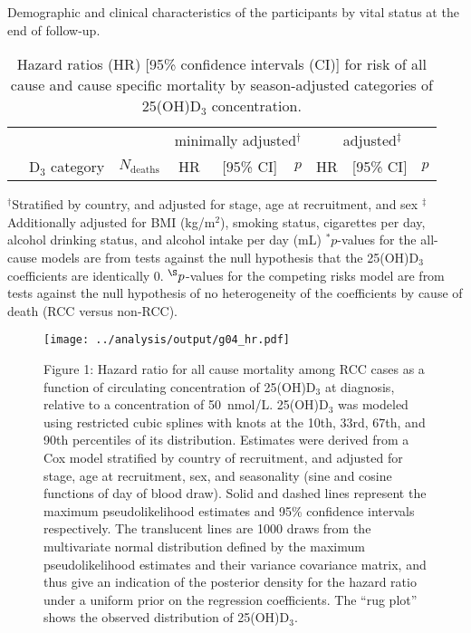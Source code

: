 \documentclass[a4paper,10pt]{article}
\begin{document}
\begin{table}
\caption{Demographic and clinical characteristics of the participants by vital 
status at the end of follow-up.}
\centering

\end{table}

\clearpage 
\begin{table}
\caption{Hazard ratios (HR) [95\% confidence intervals (CI)] for risk of all 
cause and cause specific mortality by season-adjusted categories of 25(OH)D$_3$ 
concentration.}
\begin{tabular}{lrrrrrrrr}
\toprule
& & &\multicolumn{3}{c}{minimally adjusted$^\dag$} & 
\multicolumn{3}{c}{adjusted$^\ddag$} \\
 \cmidrule(r){4-6} \cmidrule(l){7-9} 
& D$_3$ category & $N_{\text{deaths}}$ & HR & [95\% CI] & $p$ & HR & [95\% CI] 
& 
$p$ \\
\midrule

\bottomrule
\end{tabular}
\newline
{\footnotesize 
$^\dag$Stratified by country, and adjusted for stage, age at recruitment, and 
sex \newline
$^\ddag$Additionally adjusted for BMI (kg/m$^2$), smoking status, cigarettes 
per day, alcohol drinking status, and alcohol intake per day (mL) \newline
$^*p$-values for the all-cause models are from tests against the null 
hypothesis that the 25(OH)D$_3$ coefficients are identically 0. 
\newline
$^{\S}p$-values for the competing risks model are from tests against the null 
hypothesis of no heterogeneity of the coefficients by cause of death (RCC 
versus non-RCC).
}
\end{table}
\clearpage

\begin{figure}
 \centering
\caption*{Figure 1: Hazard ratio for all cause mortality among RCC cases as a 
function of 
circulating concentration of 25(OH)D$_3$ at diagnosis, relative to a 
concentration of 50~nmol/L. 25(OH)D$_3$ was modeled using restricted cubic 
splines with knots at the 10th, 33rd, 67th, and 90th percentiles of its 
distribution. Estimates were derived from a Cox model stratified by country of 
recruitment, and adjusted for stage, age at recruitment, sex, and seasonality 
(sine and cosine functions of day of blood draw). Solid and 
dashed lines represent the maximum pseudolikelihood estimates and 95\% 
confidence intervals respectively. The translucent lines are 1000 draws from 
the multivariate normal distribution defined by the maximum pseudolikelihood 
estimates and their variance covariance matrix, and thus give an indication of 
the posterior density for the hazard ratio under a uniform prior on the 
regression coefficients. The ``rug plot'' shows the observed distribution of 
25(OH)D$_3$.}
\texttt{[image: ../analysis/output/g04\_hr.pdf]}
\end{figure}
\end{document}
